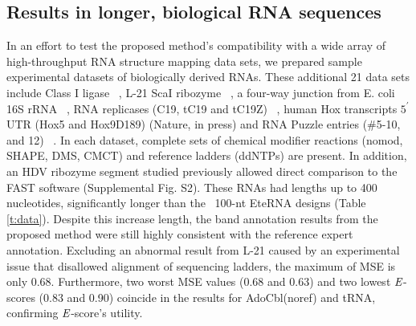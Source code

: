 \subsection{Results in longer, biological RNA sequences}
In an effort to test the proposed method's compatibility with a wide array of high-throughput RNA structure mapping data sets, we prepared sample experimental datasets of biologically derived RNAs. These additional 21 data sets include Class I ligase ~\citep{Bagby01122009}, L-21 ScaI ribozyme ~\citep{Shi2009}, a four-way junction from E. coli 16S rRNA ~\citep{tian2014nature}, RNA replicases (C19, tC19 and tC19Z) ~\citep{Wochner08042011}, human Hox transcripts $5^\prime$ UTR (Hox5 and Hox9D189) (Nature, in press) and RNA Puzzle entries (\#5-10, and 12) ~\citep{Cruz01042012}. In each dataset, complete sets of chemical modifier reactions (nomod, SHAPE, DMS, CMCT) and reference ladders (ddNTPs) are present. In addition, an HDV ribozyme segment studied previously \citep{Pang2011} allowed direct comparison to the FAST software (Supplemental Fig. S2). These RNAs had lengths up to 400 nucleotides, significantly longer than the ~100-nt EteRNA designs (Table \ref{t:data}). Despite this increase length, the band annotation results from the proposed method were still highly consistent with the reference expert annotation. Excluding an abnormal result from L-21 caused by an experimental issue that disallowed alignment of sequencing ladders, the maximum of MSE is only 0.68. Furthermore, two worst MSE values (0.68 and 0.63) and two lowest ${\emph{E}}$-scores (0.83 and 0.90) coincide in the results for AdoCbl(noref) and tRNA, confirming ${\emph{E}}$-score's utility. 

